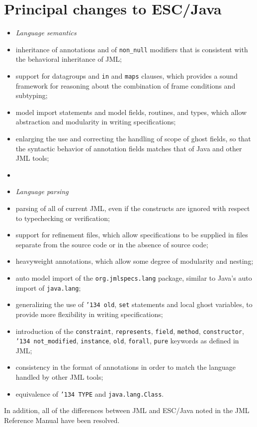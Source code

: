 \documentclass{llncs}
\begin{document}
\section{Principal changes to ESC/Java}
\setlength{\partopsep}{0in}\setlength{\parskip}{0in}\setlength{\itemsep}{0in}\setlength{\topsep}{0in}
\begin{itemize}
\setlength{\partopsep}{0in}\setlength{\parskip}{0in}\setlength{\itemsep}{0in}\setlength{\topsep}{0in}
\item[] \textit{Language semantics}
\item inheritance of annotations and of \texttt{non\_null}
  modifiers that is consistent with the behavioral inheritance of JML;
\item support for datagroups and \texttt{in} and \texttt{maps} clauses, which provides a sound framework for reasoning about the combination of frame conditions and subtyping;
\item model import statements and model fields, routines, and types, which allow abstraction 
and modularity in writing specifications;
\item enlarging the use and correcting the handling of scope of ghost fields, so that the syntactic behavior 
of annotation fields matches that of Java and other JML tools;
\item[]
\item[] \textit{Language parsing}
\item parsing of all of current JML, even if the constructs are
  ignored with respect to typechecking or verification;
\item support for refinement files, which allow specifications to be supplied in files separate from the source code or in the absence of source code;
\item heavyweight annotations, which allow some degree of modularity and nesting;
\item auto model import of the \texttt{org.jmlspecs.lang} package, similar to Java's auto import of \texttt{java.lang};
\item generalizing the use of \texttt{\char'134 old}, \texttt{set} statements and local ghost variables, to provide more flexibility in writing specifications;
\item introduction of the \texttt{constraint}, \texttt{represents}, \texttt{field}, \texttt{method},
\texttt{constructor}, 
\texttt{\char'134 not\_modified}, \texttt{instance}, \texttt{old}, \texttt{forall},
\texttt{pure} keywords as defined in JML;
\item consistency in the format of annotations in order to match the language handled by other JML tools;
\item equivalence of \texttt{\char'134 TYPE} and \texttt{java.lang.Class}.
\end{itemize}
In addition, all of the differences between JML and ESC/Java noted in
the JML Reference Manual have been resolved.
\end{document}
